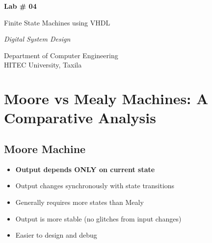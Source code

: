 \documentclass[12pt,a4paper]{article}
\begin{document}
\begin{titlepage}
    \centering
    \vspace*{1cm}
    {\Huge\bfseries Lab \# 04\par}
    \vspace{0.5cm}
    {\LARGE Finite State Machines using VHDL\par}
    \vspace{1cm}
    {\Large\itshape Digital System Design\par}
    \vspace{2cm}


    \vfill
    {\large Department of Computer Engineering\\
    HITEC University, Taxila\par}
\end{titlepage}

\tableofcontents
\newpage

\section{Moore vs Mealy Machines: A Comparative Analysis}

\subsection{Moore Machine}
\begin{itemize}[leftmargin=*]
    \item \textbf{Output depends ONLY on current state}
    \item Output changes synchronously with state transitions
    \item Generally requires more states than Mealy
    \item Output is more stable (no glitches from input changes)
    \item Easier to design and debug
\end{itemize}
\end{document}
